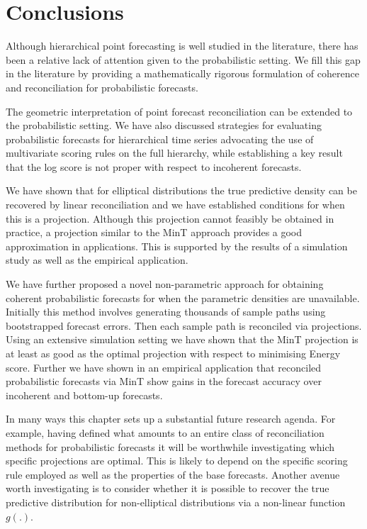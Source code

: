 \documentclass[12pt]{article}
\theoremstyle{definition}
\begin{document}
\section{Conclusions}\label{sec:conclusion}

Although hierarchical point forecasting is well studied in the literature, there has been a relative lack of attention given to the probabilistic setting. We fill this gap in the literature by providing a mathematically rigorous formulation of coherence and reconciliation for probabilistic forecasts.

The geometric interpretation of point forecast reconciliation can be extended to the probabilistic setting. We have also discussed strategies for evaluating probabilistic forecasts for hierarchical time series advocating the use of multivariate scoring rules on the full hierarchy, while establishing a key result that the log score is not proper with respect to incoherent forecasts.

We have shown that for elliptical distributions the true predictive density can be recovered by linear reconciliation and we have established conditions for when this is a projection. Although this projection cannot feasibly be obtained in practice, a projection similar to the MinT approach provides a good approximation in applications. This is supported by the results of a simulation study as well as the empirical application.

We have further proposed a novel non-parametric approach for obtaining coherent probabilistic forecasts for when the parametric densities are unavailable. Initially this method involves generating thousands of sample paths using bootstrapped forecast errors. Then each sample path is reconciled via projections. Using an extensive simulation setting we have shown that the MinT projection is at least as good as the optimal projection with respect to minimising Energy score. Further we have shown in an empirical application that reconciled probabilistic forecasts via MinT show gains in the forecast accuracy over incoherent and bottom-up forecasts.


In many ways this chapter sets up a substantial future research agenda. For example, having defined what amounts to an entire class of reconciliation methods for probabilistic forecasts it will be worthwhile investigating which specific projections are optimal. This is likely to depend on the specific scoring rule employed as well as the properties of the base forecasts. Another avenue worth investigating is to consider whether it is possible to recover the true predictive distribution for non-elliptical distributions via a non-linear function $g(.)$.
\end{document}
